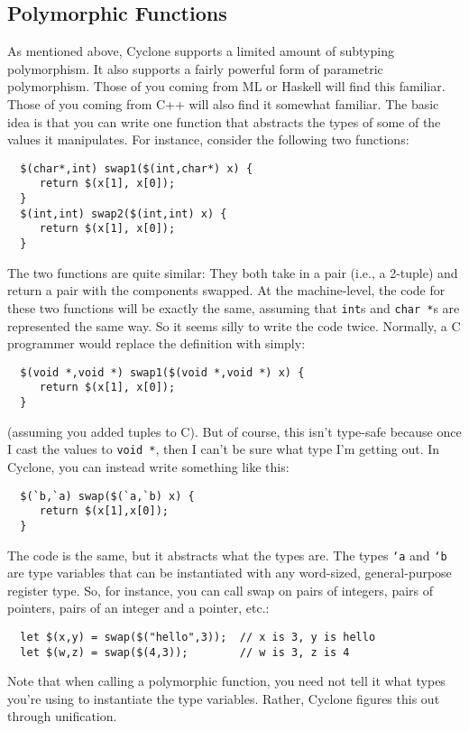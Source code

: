 \subsection{Polymorphic Functions}
As mentioned above, Cyclone supports a limited amount of subtyping
polymorphism.  It also supports a fairly powerful form of parametric
polymorphism.  Those of you coming from ML or Haskell will find this
familiar.  Those of you coming from C++ will also find it somewhat
familiar.  The basic idea is that you can write one function that
abstracts the types of some of the values it manipulates.  For
instance, consider the following two functions:
\begin{verbatim}
  $(char*,int) swap1($(int,char*) x) {
     return $(x[1], x[0]);
  }
  $(int,int) swap2($(int,int) x) {
     return $(x[1], x[0]);
  }
\end{verbatim}

The two functions are quite similar: They both take in a pair (i.e., a
2-tuple) and return a pair with the components swapped.  At the
machine-level, the code for these two functions will be exactly the
same, assuming that \texttt{int}s and \texttt{char *}s are
represented the same way.  So it seems silly to write the code twice.
Normally, a C programmer would replace the definition with simply:
\begin{verbatim}
  $(void *,void *) swap1($(void *,void *) x) {
     return $(x[1], x[0]);
  }
\end{verbatim}
(assuming you added tuples to C).  But of course, this isn't type-safe
because once I cast the values to \texttt{void *}, then I can't be sure
what type I'm getting out.  In Cyclone, you can instead write
something like this:
\begin{verbatim}
  $(`b,`a) swap($(`a,`b) x) {
     return $(x[1],x[0]);
  }
\end{verbatim}
The code is the same, but it abstracts what the types are.  The types
\texttt{`a} and \texttt{`b} are type variables that can be instantiated
with any word-sized, general-purpose register type.  So, for instance,
you can call swap on pairs of integers, pairs of pointers, pairs of an
integer and a pointer, etc.:
\begin{verbatim}
  let $(x,y) = swap($("hello",3));  // x is 3, y is hello
  let $(w,z) = swap($(4,3));        // w is 3, z is 4
\end{verbatim}

Note that when calling a polymorphic function, you need not tell it
what types you're using to instantiate the type variables.  Rather,
Cyclone figures this out through unification.

